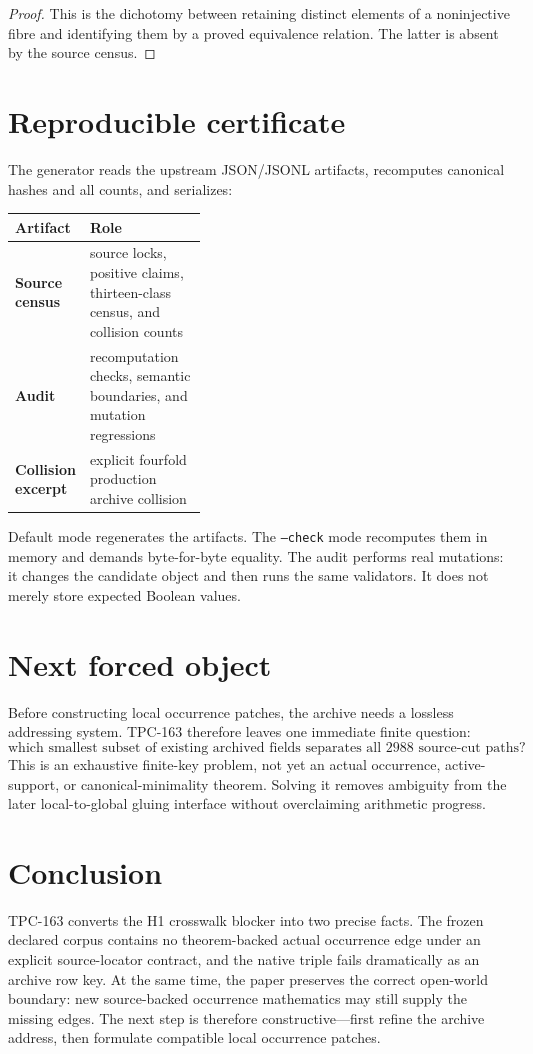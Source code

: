 \documentclass[11pt]{article}
\theoremstyle{definition}
\theoremstyle{remark}
\begin{document}
\begin{proof}
This is the dichotomy between retaining distinct elements of a
noninjective fibre and identifying them by a proved equivalence
relation.  The latter is absent by the source census.
\end{proof}

\section{Reproducible certificate}

The generator reads the upstream JSON/JSONL artifacts, recomputes
canonical hashes and all counts, and serializes:
\begin{center}
\begin{tabularx}{0.96\linewidth}{@{}P{0.38\linewidth}Y@{}}
\toprule
\textbf{Artifact} & \textbf{Role}\\
\midrule
\textbf{Source census}
 & source locks, positive claims, thirteen-class census, and collision
   counts\\
\textbf{Audit}
 & recomputation checks, semantic boundaries, and mutation regressions\\
\textbf{Collision excerpt}
 & explicit fourfold production archive collision\\
\bottomrule
\end{tabularx}
\end{center}
Default mode regenerates the artifacts.  The \texttt{--check} mode
recomputes them in memory and demands byte-for-byte equality.  The
audit performs real mutations: it changes the candidate object and
then runs the same validators.  It does not merely store expected
Boolean values.

\section{Next forced object}

Before constructing local occurrence patches, the archive needs a
lossless addressing system.  TPC-163 therefore leaves one immediate
finite question:
\[
 \text{which smallest subset of existing archived fields separates
 all \(2988\) source-cut paths?}
\]
This is an exhaustive finite-key problem, not yet an actual
occurrence, active-support, or canonical-minimality theorem.  Solving
it removes ambiguity from the later local-to-global gluing interface
without overclaiming arithmetic progress.

\section{Conclusion}

TPC-163 converts the H1 crosswalk blocker into two precise facts.
The frozen declared corpus contains no theorem-backed actual
occurrence edge under an explicit source-locator contract, and the
native triple fails dramatically as an archive row key.  At the same
time, the paper preserves the correct open-world boundary: new
source-backed occurrence mathematics may still supply the missing
edges.  The next step is therefore constructive---first refine the
archive address, then formulate compatible local occurrence patches.



\end{document}
